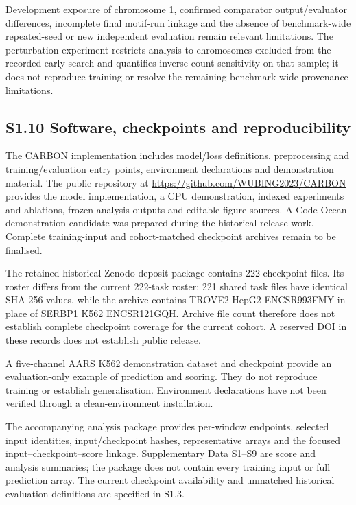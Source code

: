 \documentclass[11pt]{article}
\begin{document}
Development exposure of chromosome 1, confirmed comparator output/evaluator differences, incomplete final motif-run linkage and the absence of benchmark-wide repeated-seed or new independent evaluation remain relevant limitations. The perturbation experiment restricts analysis to chromosomes excluded from the recorded early search and quantifies inverse-count sensitivity on that sample; it does not reproduce training or resolve the remaining benchmark-wide provenance limitations.

\subsection*{S1.10 Software, checkpoints and reproducibility}

The CARBON implementation includes model/loss definitions, preprocessing and training/evaluation entry points, environment declarations and demonstration material. The public repository at \url{https://github.com/WUBING2023/CARBON} provides the model implementation, a CPU demonstration, indexed experiments and ablations, frozen analysis outputs and editable figure sources. A Code Ocean demonstration candidate was prepared during the historical release work. Complete training-input and cohort-matched checkpoint archives remain to be finalised.

The retained historical Zenodo deposit package contains 222 checkpoint files. Its roster differs from the current 222-task roster: 221 shared task files have identical SHA-256 values, while the archive contains TROVE2 HepG2 ENCSR993FMY in place of SERBP1 K562 ENCSR121GQH. Archive file count therefore does not establish complete checkpoint coverage for the current cohort. A reserved DOI in these records does not establish public release.

A five-channel AARS K562 demonstration dataset and checkpoint provide an evaluation-only example of prediction and scoring. They do not reproduce training or establish generalisation. Environment declarations have not been verified through a clean-environment installation.

The accompanying analysis package provides per-window endpoints, selected input identities, input/checkpoint hashes, representative arrays and the focused input--checkpoint--score linkage. Supplementary Data S1--S9 are score and analysis summaries; the package does not contain every training input or full prediction array. The current checkpoint availability and unmatched historical evaluation definitions are specified in S1.3.
\end{document}

